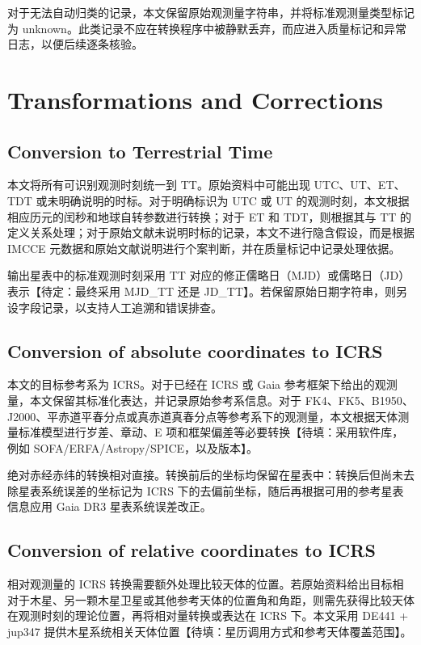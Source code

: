 \documentclass{aastex701}
\begin{document}
对于无法自动归类的记录，本文保留原始观测量字符串，并将标准观测量类型标记为 unknown。此类记录不应在转换程序中被静默丢弃，而应进入质量标记和异常日志，以便后续逐条核验。

\section{Transformations and Corrections} \label{sec:transform}

\subsection{Conversion to Terrestrial Time} \label{subsec:timescale}

本文将所有可识别观测时刻统一到 TT。原始资料中可能出现 UTC、UT、ET、TDT 或未明确说明的时标。对于明确标识为 UTC 或 UT 的观测时刻，本文根据相应历元的闰秒和地球自转参数进行转换；对于 ET 和 TDT，则根据其与 TT 的定义关系处理；对于原始文献未说明时标的记录，本文不进行隐含假设，而是根据 IMCCE 元数据和原始文献说明进行个案判断，并在质量标记中记录处理依据。

输出星表中的标准观测时刻采用 TT 对应的修正儒略日（MJD）或儒略日（JD）表示【待定：最终采用 MJD\_TT 还是 JD\_TT】。若保留原始日期字符串，则另设字段记录，以支持人工追溯和错误排查。

\subsection{Conversion of absolute coordinates to ICRS} \label{subsec:absolute_icrs}

本文的目标参考系为 ICRS。对于已经在 ICRS 或 Gaia 参考框架下给出的观测量，本文保留其标准化表达，并记录原始参考系信息。对于 FK4、FK5、B1950、J2000、平赤道平春分点或真赤道真春分点等参考系下的观测量，本文根据天体测量标准模型进行岁差、章动、E 项和框架偏差等必要转换【待填：采用软件库，例如 SOFA/ERFA/Astropy/SPICE，以及版本】。

绝对赤经赤纬的转换相对直接。转换前后的坐标均保留在星表中：转换后但尚未去除星表系统误差的坐标记为 ICRS 下的去偏前坐标，随后再根据可用的参考星表信息应用 Gaia DR3 星表系统误差改正。

\subsection{Conversion of relative coordinates to ICRS} \label{subsec:relative_icrs}

相对观测量的 ICRS 转换需要额外处理比较天体的位置。若原始资料给出目标相对于木星、另一颗木星卫星或其他参考天体的位置角和角距，则需先获得比较天体在观测时刻的理论位置，再将相对量转换或表达在 ICRS 下。本文采用 DE441 + jup347 提供木星系统相关天体位置【待填：星历调用方式和参考天体覆盖范围】。
\end{document}
